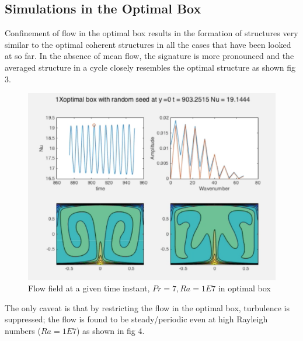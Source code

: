 \documentclass[12pt]{article}
\begin{document}
      \subsection{Simulations in the Optimal Box}
      
      Confinement of flow in the optimal box results in the formation of structures very similar to the optimal coherent structures in all the cases that have been looked at so far. In the absence of mean flow, the signature is more pronounced and the averaged structure in a cycle closely resembles the optimal structure as shown fig 3.
      
      \begin{figure}[!htb]
      	\includegraphics[width=\linewidth]{1E7opt.png}
      	\caption{Flow field at a given time instant, $Pr = 7, Ra = 1E7$ in optimal box}
      	\label{fig:fig3}
      \end{figure}
      
      
      The only caveat is that by restricting the flow in the optimal box, turbulence is suppressed; the flow is found to be steady/periodic even at high Rayleigh numbers ($Ra = 1E7$) as shown in fig 4.
      
\end{document}
